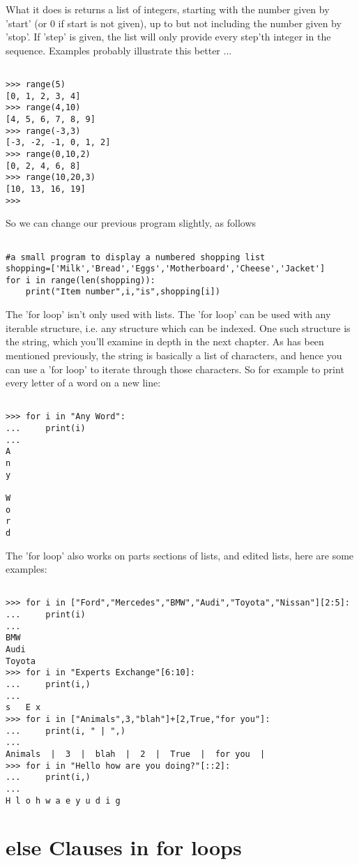 What it does is returns a list of integers, starting with the number   given by 'start' (or 0 if start is not given), up to but not including   the number given by 'stop'. If 'step' is given, the list will only   provide every step'th integer in the sequence. Examples probably   illustrate this better ...
\begin{lstlisting}

>>> range(5)
[0, 1, 2, 3, 4]
>>> range(4,10)
[4, 5, 6, 7, 8, 9]
>>> range(-3,3)
[-3, -2, -1, 0, 1, 2]
>>> range(0,10,2)
[0, 2, 4, 6, 8]
>>> range(10,20,3)
[10, 13, 16, 19]
>>>
\end{lstlisting}

So we can change our previous program slightly, as follows
\begin{lstlisting}

#a small program to display a numbered shopping list
shopping=['Milk','Bread','Eggs','Motherboard','Cheese','Jacket']
for i in range(len(shopping)):
	print("Item number",i,"is",shopping[i])
\end{lstlisting}

The 'for loop' isn't only used with lists. The 'for loop' can be used with any iterable structure, i.e. any structure which can be indexed. One such structure is the string, which you'll examine in depth in the next chapter. As has been mentioned previously, the string is basically a list of characters, and hence you can use a 'for loop' to iterate through those characters. So for example to print every letter of a word on a new line:   
\begin{lstlisting}

>>> for i in "Any Word":
...     print(i)
... 
A
n
y
 
W
o
r
d
		\end{lstlisting}

 The 'for loop' also works on parts sections of lists, and edited lists, here are some examples:
\begin{lstlisting}

>>> for i in ["Ford","Mercedes","BMW","Audi","Toyota","Nissan"][2:5]:
...     print(i)
... 
BMW
Audi
Toyota
>>> for i in "Experts Exchange"[6:10]:
...     print(i,)
... 
s   E x
>>> for i in ["Animals",3,"blah"]+[2,True,"for you"]:
...     print(i, " | ",)
... 
Animals  |  3  |  blah  |  2  |  True  |  for you  | 
>>> for i in "Hello how are you doing?"[::2]:
...     print(i,)
... 
H l o h w a e y u d i g
\end{lstlisting}

\section{else Clauses in for loops}


